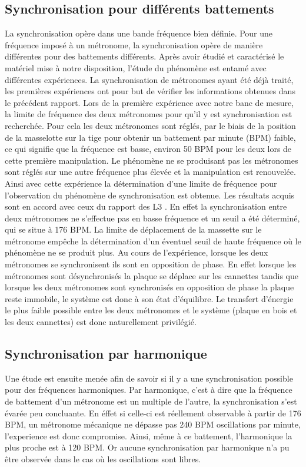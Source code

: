\documentclass[a4paper,11pt]{report}
\begin{document}
\subsection{Synchronisation pour différents battements}
La synchronisation opère dans une bande fréquence bien définie. Pour une fréquence imposé à un métronome, la synchronisation opère de manière différentes pour des battements différents. Après avoir étudié et caractérisé le matériel mise à notre disposition, l'étude du phénomène est entamé avec différentes expériences. La synchronisation de métronomes ayant été déjà traité, les premières expériences ont pour but de vérifier les informations obtenues dans le précédent rapport. Lors de la première expérience avec notre banc de mesure, la limite de fréquence des deux métronomes pour qu'il y est synchronisation est recherchée. Pour cela les deux métronomes sont réglés, par le biais de la position de la masselotte sur la tige pour obtenir un battement par minute (BPM) faible, ce qui signifie que la fréquence est basse, environ 50 BPM pour les deux lors de cette première manipulation. Le phénomène ne se produisant pas les métronomes sont réglés sur une autre fréquence plus élevée et la manipulation est renouvelée. Ainsi avec cette expérience la détermination d'une limite de fréquence pour l'observation du phénomène de synchronisation est obtenue. Les résultats acquis sont en accord avec ceux du rapport des L3 \cite{ram}. En effet la synchronisation entre deux métronomes ne s'effectue pas en basse fréquence et un seuil a été déterminé, qui se situe à 176 BPM. La limite de déplacement de la massette sur le métronome empêche la détermination d'un éventuel seuil de haute fréquence où le phénomène ne se produit plus. Au cours de l'expérience, lorsque les deux métronomes se synchronisent ils sont en opposition de phase. En effet lorsque les métronomes sont désynchronisés la plaque se déplace sur les cannettes tandis que lorsque les deux métronomes sont synchronisés en opposition de phase la plaque reste immobile, le système est donc à son état d'équilibre. Le transfert d'énergie le plus faible possible entre les deux métronomes et le système (plaque en bois et les deux cannettes) est donc naturellement privilégié.	

\subsection{Synchronisation par harmonique}
Une étude est ensuite menée afin de savoir si il y a une synchronisation possible pour des fréquences harmoniques. Par harmonique, c'est à dire que la fréquence de battement d'un métronome est un multiple de l'autre, la synchronisation s'est évarée peu concluante. En éffet si celle-ci est réellement observable à partir de 176 BPM, un métronome mécanique ne dépasse pas 240 BPM oscillations par minute, l'experience est donc compromise. Ainsi, même à ce battement, l'harmonique la plus proche est à 120 BPM. Or aucune synchronisation par harmonique n'a pu être observée dans le cas où les oscillations sont libres.
\end{document}
